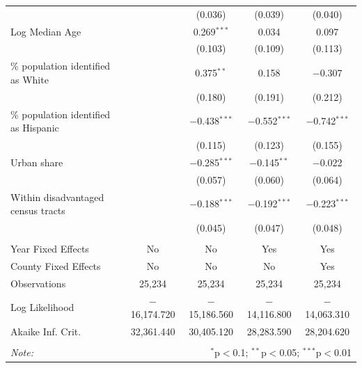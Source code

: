 \documentclass[11pt,twoside,letterpaper]{article}
\begin{document}
\begin{table}[H]
{\begin{tabular}{@{\extracolsep{5pt}}lcccc}
  &  & (0.036) & (0.039) & (0.040) \\ 
  Log Median Age &  & 0.269$^{***}$ & 0.034 & 0.097 \\ 
  &  & (0.103) & (0.109) & (0.113) \\ 
  \% population identified as White &  & 0.375$^{**}$ & 0.158 & $-$0.307 \\ 
  &  & (0.180) & (0.191) & (0.212) \\ 
  \% population identified as Hispanic &  & $-$0.438$^{***}$ & $-$0.552$^{***}$ & $-$0.742$^{***}$ \\ 
  &  & (0.115) & (0.123) & (0.155) \\ 
  Urban share &  & $-$0.285$^{***}$ & $-$0.145$^{**}$ & $-$0.022 \\ 
  &  & (0.057) & (0.060) & (0.064) \\ 
  Within disadvantaged census tracts &  & $-$0.188$^{***}$ & $-$0.192$^{***}$ & $-$0.223$^{***}$ \\ 
  &  & (0.045) & (0.047) & (0.048) \\ 
 \hline \\[-1.8ex] 
Year Fixed Effects & No & No & Yes & Yes \\ 
County Fixed Effects & No & No & No & Yes \\ 
Observations & 25,234 & 25,234 & 25,234 & 25,234 \\ 
Log Likelihood & $-$16,174.720 & $-$15,186.560 & $-$14,116.800 & $-$14,063.310 \\ 
Akaike Inf. Crit. & 32,361.440 & 30,405.120 & 28,283.590 & 28,204.620 \\ 
\hline 
\hline \\[-1.8ex] 
\textit{Note:}  & \multicolumn{4}{r}{$^{*}$p$<$0.1; $^{**}$p$<$0.05; $^{***}$p$<$0.01} \\ 
\end{tabular}  }
\end{table} 
\end{document}
